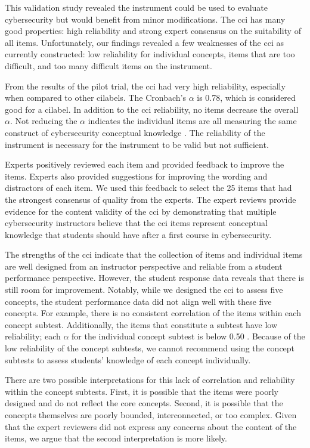 This validation study revealed the instrument could be used to evaluate cybersecurity but would benefit from minor modifications. The \gls{cci} has many good properties: high reliability and strong expert consensus on the suitability of all items. Unfortunately, our findings revealed a few weaknesses of the \gls{cci} as currently constructed: low reliability for individual concepts, items that are too difficult, and too many difficult items on the instrument.

From the results of the pilot trial, the \gls{cci} had very high reliability, especially when compared to other \glspl{cilabel}. The Cronbach's $\alpha$ is 0.78, which is considered good for a \gls{cilabel}. In addition to the \gls{cci} reliability, no items decrease the overall $\alpha$. Not reducing the $\alpha$ indicates the individual items are all measuring the same construct of cybersecurity conceptual knowledge \cite{dlci}. The reliability of the instrument is necessary for the instrument to be valid but not sufficient.

Experts positively reviewed each item and provided feedback to improve the items. Experts also provided suggestions for improving the wording and distractors of each item. We used this feedback to select the 25 items that had the strongest consensus of quality from the experts. The expert reviews provide evidence for the content validity of the \gls{cci} by demonstrating that multiple cybersecurity instructors believe that the \gls{cci} items represent conceptual knowledge that students should have after a first course in cybersecurity. 


The strengths of the \gls{cci} indicate that the collection of items and individual items are well designed from an instructor perspective and reliable from a student performance perspective. However, the student response data reveals that there is still room for improvement. Notably, while we designed the \gls{cci} to assess five concepts, the student performance data did not align well with these five concepts. For example, there is no consistent correlation of the items within each concept subtest. Additionally, the items that constitute a subtest have low reliability; each $\alpha$ for the individual concept subtest is below 0.50 \cite{jorian}. Because of the low reliability of the concept subtests, we cannot recommend using the concept subtests to assess students' knowledge of each concept individually.

There are two possible interpretations for this lack of correlation and reliability within the concept subtests. First, it is possible that the items were poorly designed and do not reflect the core concepts. Second, it is possible that the concepts themselves are poorly bounded, interconnected, or too complex. Given that the expert reviewers did not express any concerns about the content of the items, we argue that the second interpretation is more likely. 

